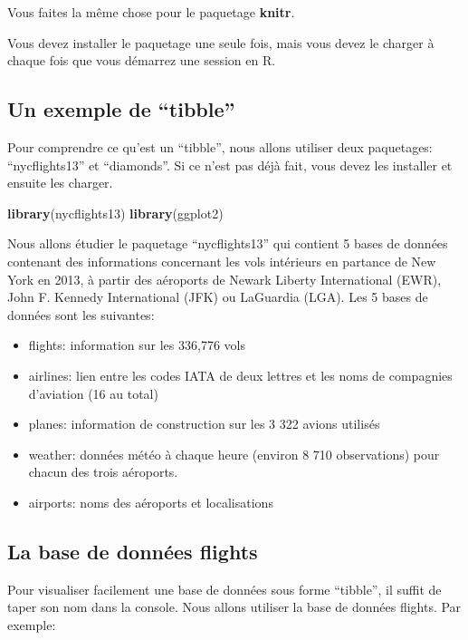 \documentclass[]{book}
\newenvironment{Shaded}{\begin{snugshade}}{\end{snugshade}}
\newcommand{\KeywordTok}[1]{\textcolor[rgb]{0.13,0.29,0.53}{\textbf{#1}}}
\newcommand{\NormalTok}[1]{#1}
\providecommand{\tightlist}{%
  \setlength{\itemsep}{0pt}\setlength{\parskip}{0pt}}
\begin{document}
Vous faites la même chose pour le paquetage \textbf{knitr}.

Vous devez installer le paquetage une seule fois, mais vous devez le
charger à chaque fois que vous démarrez une session en R.

\subsection{\texorpdfstring{Un exemple de
``tibble''}{Un exemple de tibble}}\label{un-exemple-de-tibble}

Pour comprendre ce qu'est un ``tibble'', nous allons utiliser deux
paquetages: ``nycflights13'' et ``diamonds''. Si ce n'est pas déjà fait,
vous devez les installer et ensuite les charger.

\begin{Shaded}
\begin{Highlighting}[]
\KeywordTok{library}\NormalTok{(nycflights13)}
\KeywordTok{library}\NormalTok{(ggplot2)}
\end{Highlighting}
\end{Shaded}

Nous allons étudier le paquetage ``nycflights13'' qui contient 5 bases
de données contenant des informations concernant les vols intérieurs en
partance de New York en 2013, à partir des aéroports de Newark Liberty
International (EWR), John F. Kennedy International (JFK) ou LaGuardia
(LGA). Les 5 bases de données sont les suivantes:

\begin{itemize}
\tightlist
\item
  flights: information sur les 336,776 vols
\item
  airlines: lien entre les codes IATA de deux lettres et les noms de
  compagnies d'aviation (16 au total)
\item
  planes: information de construction sur les 3 322 avions utilisés
\item
  weather: données météo à chaque heure (environ 8 710 observations)
  pour chacun des trois aéroports.
\item
  airports: noms des aéroports et localisations
\end{itemize}

\subsection{La base de données
flights}\label{la-base-de-donnees-flights}

Pour visualiser facilement une base de données sous forme ``tibble'', il
suffit de taper son nom dans la console. Nous allons utiliser la base de
données flights. Par exemple:
\end{document}
